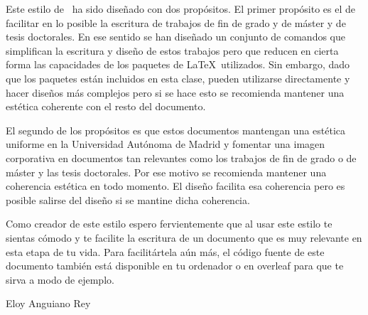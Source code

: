 Este estilo de \LaTeXe\ ha sido diseñado con dos propósitos. El primer propósito es el de facilitar en lo posible la escritura de trabajos de fin de grado y de máster y de tesis doctorales. En ese sentido se han diseñado un conjunto de comandos que simplifican la escritura y diseño de estos trabajos pero que reducen en cierta forma las capacidades de los paquetes de \LaTeX\ utilizados. Sin embargo, dado que los paquetes están incluidos en esta clase, pueden utilizarse directamente y hacer diseños más complejos pero si se hace esto se recomienda mantener una estética coherente con el resto del documento.

El segundo de los propósitos es que estos documentos mantengan una estética uniforme en la Universidad Autónoma de Madrid y fomentar una imagen corporativa en documentos tan relevantes como los trabajos de fin de grado o de máster y las tesis doctorales. Por ese motivo se recomienda mantener una coherencia estética en todo momento. El diseño facilita esa coherencia pero es posible salirse del diseño si se mantine dicha coherencia.

Como creador de este estilo espero fervientemente que al usar este estilo te sientas cómodo y te facilite la escritura de un documento que es muy relevante en esta etapa de tu vida. Para facilitártela aún más, el código fuente de este documento también está disponible en tu ordenador o en overleaf para que te sirva a modo de ejemplo.

\hfill \begin{flushright}Eloy Anguiano Rey\end{flushright}\hfill
